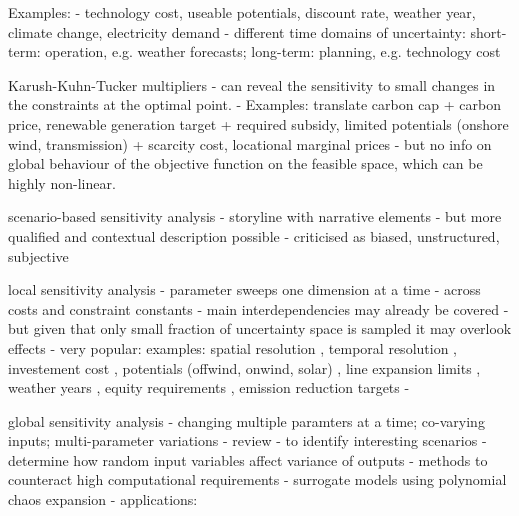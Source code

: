 
Examples:
- technology cost, useable potentials, discount rate, weather year, climate change, electricity demand
- different time domains of uncertainty: short-term: operation, e.g. weather forecasts; long-term: planning, e.g. technology cost

Karush-Kuhn-Tucker multipliers
- can reveal the sensitivity to small changes in the constraints at the optimal point.
- Examples: translate carbon cap + carbon price, renewable generation target + required subsidy, limited potentials (onshore wind, transmission) + scarcity cost, locational marginal prices
- but no info on global behaviour of the objective function on the feasible space, which can be highly non-linear.
    
scenario-based sensitivity analysis
- storyline with narrative elements \cite{DeCarolis2017}
- but more qualified and contextual description possible \cite{soroudi_decision_2013}
- criticised as biased, unstructured, subjective \cite{usher_value_2015}

local sensitivity analysis
- parameter sweeps one dimension at a time \cite{schlachtberger_cost_2018}
- across costs and constraint constants
- main interdependencies may already be covered \cite{schlachtberger_cost_2018}
- but given that only small fraction of uncertainty space is sampled it may overlook effects \cite{pizarro-alonso_uncertainties_2019}
- very popular: examples: spatial resolution \cite{hoersch_spatial_2017}, temporal resolution \cite{kotzur_tsa_2018}, investement cost \cite{shirizadeh_how_2019}, potentials (offwind, onwind, solar) \cite{schlachtberger_cost_2018}, line expansion limits \cite{schlachtberger_benefits_2017}, weather years \cite{bloomfield_2021}, equity requirements \cite{sasse_regional_2020,sasse_distributional_2019}, emission reduction targets
- \cite{schyska_sensitivity_2020}

global sensitivity analysis
- changing multiple paramters at a time; co-varying inputs; multi-parameter variations
- review \cite{iooss_review_2014}
- to identify interesting scenarios \cite{usher_value_2015}
- determine how random input variables affect variance of outputs \cite{sudret_global_2008}
- methods to counteract high computational requirements \cite{usher_value_2015} \cite{pizarro-alonso_uncertainties_2019} \cite{moret_robust_2016}
- surrogate models using polynomial chaos expansion \cite{trondle_trade-offs_2020}
- applications: \cite{fais_impact_2016,mavromatidis_uncertainty_2018,pilpola_analyzing_2020}

